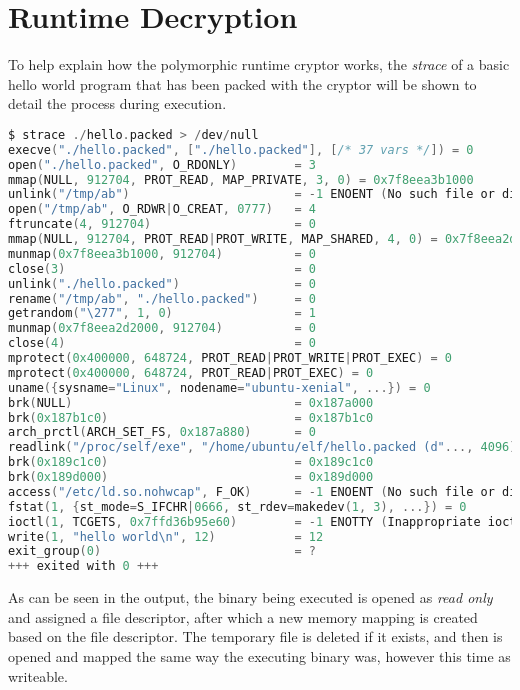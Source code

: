 \documentclass[a4paper, 11pt]{article} %
\begin{document}

\section*{Runtime Decryption}

To help explain how the polymorphic runtime cryptor works, the \textit{strace} of a basic hello world program that has been packed with the cryptor will be shown to detail the process during execution.

\hfill
\begin{lstlisting}[language=C]
$ strace ./hello.packed > /dev/null
execve("./hello.packed", ["./hello.packed"], [/* 37 vars */]) = 0
open("./hello.packed", O_RDONLY)        = 3
mmap(NULL, 912704, PROT_READ, MAP_PRIVATE, 3, 0) = 0x7f8eea3b1000
unlink("/tmp/ab")                       = -1 ENOENT (No such file or directory)
open("/tmp/ab", O_RDWR|O_CREAT, 0777)   = 4
ftruncate(4, 912704)                    = 0
mmap(NULL, 912704, PROT_READ|PROT_WRITE, MAP_SHARED, 4, 0) = 0x7f8eea2d2000
munmap(0x7f8eea3b1000, 912704)          = 0
close(3)                                = 0
unlink("./hello.packed")                = 0
rename("/tmp/ab", "./hello.packed")     = 0
getrandom("\277", 1, 0)                 = 1
munmap(0x7f8eea2d2000, 912704)          = 0
close(4)                                = 0
mprotect(0x400000, 648724, PROT_READ|PROT_WRITE|PROT_EXEC) = 0
mprotect(0x400000, 648724, PROT_READ|PROT_EXEC) = 0
uname({sysname="Linux", nodename="ubuntu-xenial", ...}) = 0
brk(NULL)                               = 0x187a000
brk(0x187b1c0)                          = 0x187b1c0
arch_prctl(ARCH_SET_FS, 0x187a880)      = 0
readlink("/proc/self/exe", "/home/ubuntu/elf/hello.packed (d"..., 4096) = 39
brk(0x189c1c0)                          = 0x189c1c0
brk(0x189d000)                          = 0x189d000
access("/etc/ld.so.nohwcap", F_OK)      = -1 ENOENT (No such file or directory)
fstat(1, {st_mode=S_IFCHR|0666, st_rdev=makedev(1, 3), ...}) = 0
ioctl(1, TCGETS, 0x7ffd36b95e60)        = -1 ENOTTY (Inappropriate ioctl for device)
write(1, "hello world\n", 12)           = 12
exit_group(0)                           = ?
+++ exited with 0 +++
\end{lstlisting}

\hfill

As can be seen in the output, the binary being executed is opened as \textit{read only} and assigned a file descriptor, after which a new memory mapping is created based on the file descriptor. The temporary file is deleted if it exists, and then is opened and mapped the same way the executing binary was, however this time as writeable.
\end{document}
